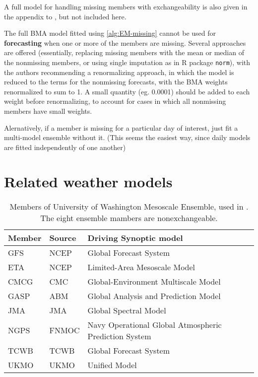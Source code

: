 \documentclass[10pt,fleqn]{article}
\begin{document}
A full model for handling missing members with exchangeability is also given in the appendix to \cite{Fraley2010}, but not included here.

The full BMA model fitted using \autoref{alg:EM-missing} cannot be used for \textbf{forecasting} when one or more of the members are missing. Several approaches are offered (essentially, replacing missing members with the mean or median of the nonmissing members, or using single imputation as in R package \texttt{norm}), with the authors recommending a renormalizing approach, in which the model is reduced to the terms for the nonmissing forecasts, with the BMA weights renormalized to sum to 1. A small quantity (eg. 0.0001) should be added to each weight before renormalizing, to account for cases in which all nonmissing members have small weights.

Alernatively, if a member is missing for a particular day of interest, just fit a multi-model ensemble without it. (This seems the easiest way, since daily models are fitted independently of one another)



 
\FloatBarrier

\hrulefill
\printbibliography
\hrulefill


\appendix

\section{Related weather models}

\begin{table}[!ht]
\caption{Members of University of Washington Mesoscale Ensemble, used in \cite{Fraley2010}. \\The eight ensemble mambers are nonexchangeable.}
%
\begin{tabular}{l l l}
\hline
\textbf{Member} & \textbf{Source} & \textbf{Driving Synoptic model} \\
\hline
GFS &  NCEP & Global Forecast System \\
ETA & NCEP & Limited-Area Mesoscale Model \\
CMCG & CMC & Global-Environment Multiscale Model \\
GASP & ABM & Global Analysis and Prediction Model \\
JMA & JMA & Global Spectral Model \\
NGPS & FNMOC & Navy Operational Global Atmospheric Prediction System \\
TCWB &  TCWB &  Global Forecast System \\
UKMO & UKMO & Unified Model \\
\hline
\end{tabular}
\end{table}
\end{document}
